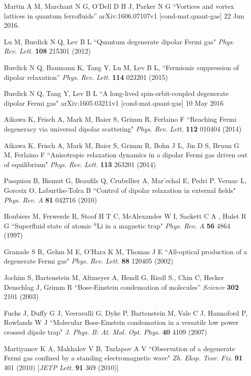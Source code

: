 \documentclass[pra,letterpaper,twocolumn,showpacs,superscriptaddress]{revtex4}
\begin{document}
\begin{thebibliography}{300}
 Martin A M, Marchant N G, O'Dell D H J, Parker N G
``Vortices and vortex lattices in quantum ferrofluids''
arXiv:1606.07107v1 [cond-mat.quant-gas] 22 Jun 2016.

 Lu M, Burdick N Q, Lev B L
``Quantum degenerate dipolar Fermi gas"
{\it Phys. Rev. Lett.} \textbf{108} 215301 (2012)

 Burdick N Q, Baumann K, Tang Y, Lu M, Lev B L,
``Fermionic suppression of dipolar relaxation''
{\it Phys. Rev. Lett.} \textbf{114} 023201 (2015)

 Burdick N Q, Tang Y, Lev B L 
``A long-lived spin-orbit-coupled degenerate dipolar Fermi gas" arXiv:1605.03211v1 [cond-mat.quant-gas] 10 May 2016

 Aikawa K, Frisch A, Mark M, Baier S, Grimm R, Ferlaino F
``Reaching Fermi degeneracy via universal dipolar scattering"
{\it Phys. Rev. Lett.} \textbf{112} 010404 (2014)

 Aikawa K, Frisch A, Mark M, Baier S, Grimm R, Bohn J L, Jin D S, Bruun G M, Ferlaino F
``Anisotropic relaxation dynamics in a dipolar Fermi gas driven out of equilibrium"
{\it Phys. Rev. Lett.} \textbf{113} 263201 (2014)

 Pasquiou B, Bismut G, Beaufils Q, Crubellier A, Mar'echal E, Pedri P, Vernac L, Gorceix O, Laburthe-Tolra B
``Control of dipolar relaxation in external fields"
{\it Phys. Rev. A} \textbf{81} 042716 (2010)

 Houbiers M, Ferwerde R, Stoof H T C, McAlexander W I, Sackett C A , Hulet R G  
``Superfluid state of atomic ${}^6$Li in a magnetic trap" {\it Phys. Rev. A} \textbf{56} 4864 (1997)

 Granade S R, Gehm M E, O'Hara K M, Thomas J E 
``All-optical production of a degenerate Fermi gas" {\it Phys. Rev. Lett.} \textbf{88} 120405 (2002)

 Jochim S, Bartenstein M, Altmeyer A, Hendl G, Riedl S., Chin C, Hecker Denschlag J, Grimm R
``Bose-Einstein condensation of molecules''
{\it Science} \textbf{302} 2101 (2003)

 Fuchs J, Duffy G J, Veeravalli G, Dyke P, Bartenstein M, Vale C J, Hannaford P, Rowlands W J
``Molecular Bose-Einstein condensation in a versatile low power crossed dipole trap"
{\it J. Phys. B: At. Mol. Opt. Phys.} \textbf{40} 4109 (2007)

 Martiyanov K A, Makhalov V B, Turlapov A V
``Observation of a degenerate Fermi gas confined by a standing electromagnetic wave"
{\it Zh. Eksp. Teor. Fiz.} \textbf{91} 401 (2010) [{\it JETP Lett.} \textbf{91} 369 (2010)]


\end{thebibliography}
\end{document}
